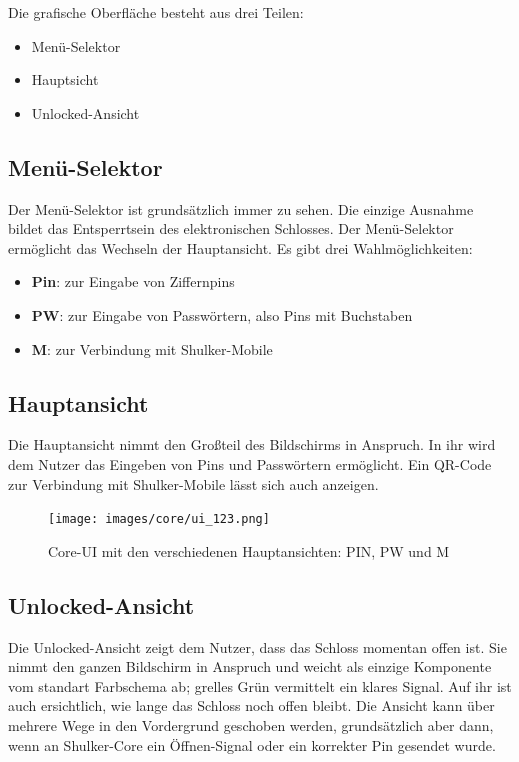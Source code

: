 Die grafische Oberfläche besteht aus drei Teilen:
\begin{itemize}
    \item Menü-Selektor
    \item Hauptsicht
    \item Unlocked-Ansicht
\end{itemize}

\subsection{Menü-Selektor}
Der Menü-Selektor ist grundsätzlich immer zu sehen. Die einzige Ausnahme bildet das Entsperrtsein des elektronischen
Schlosses. Der Menü-Selektor ermöglicht das Wechseln der Hauptansicht. Es gibt drei Wahlmöglichkeiten:
\begin{itemize}
    \item \textbf{Pin}: zur Eingabe von Ziffernpins
    \item \textbf{PW}: zur Eingabe von Passwörtern, also Pins mit Buchstaben
    \item \textbf{M}: zur Verbindung mit Shulker-Mobile
\end{itemize}

\subsection{Hauptansicht}
Die Hauptansicht nimmt den Großteil des Bildschirms in Anspruch. In ihr wird dem Nutzer das Eingeben von Pins und Passwörtern
ermöglicht. Ein QR-Code zur Verbindung mit Shulker-Mobile lässt sich auch anzeigen.

\begin{figure}[H]
    \begin{center}
        \texttt{[image: images/core/ui\_123.png]}
        \caption{Core-UI mit den verschiedenen Hauptansichten: PIN, PW und M}
    \end{center}
\end{figure}

\subsection{Unlocked-Ansicht}
Die Unlocked-Ansicht zeigt dem Nutzer, dass das Schloss momentan offen ist. Sie nimmt den ganzen Bildschirm in Anspruch und weicht
als einzige Komponente vom standart Farbschema ab; grelles Grün vermittelt ein klares Signal. Auf ihr ist auch ersichtlich,
wie lange das Schloss noch offen bleibt. Die Ansicht kann über mehrere Wege in den Vordergrund geschoben werden, grundsätzlich aber dann,
wenn an Shulker-Core ein Öffnen-Signal oder ein korrekter Pin gesendet wurde.

